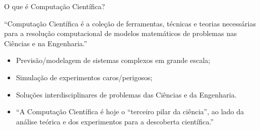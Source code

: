 \documentclass{beamer}
\begin{document}
\begin{darkframes}
  \begin{frame}{O que é Computação Científica?}
    \begin{block}{}
      ``Computação Científica é a coleção de ferramentas, técnicas e teorias necessárias para a resolução computacional de modelos matemáticos de problemas nas Ciências e na Engenharia.'' \cite{GolubOrtega}
    \end{block}
    \begin{itemize}
    \item<2-> Previsão/modelagem de sistemas complexos em grande escala;
    \item<3-> Simulação de experimentos caros/perigosos;
    \item<4-> Soluções interdisciplinares de problemas das Ciências e da Engenharia.
    \item<5> ``A Computação Científica é hoje o “terceiro pilar da ciência”, ao lado da análise teórica e dos experimentos para a descoberta científica.'' \cite{TUKweb}
    \end{itemize}
  \end{frame}

  

\end{darkframes}
\end{document}
